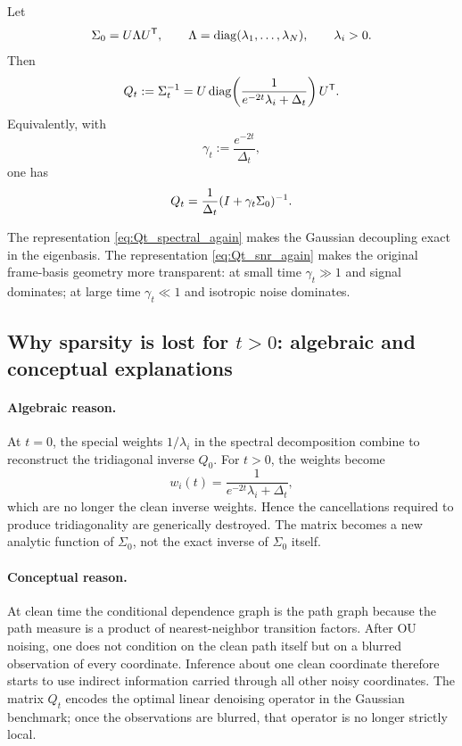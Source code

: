 \documentclass[11pt]{article}
\begin{document}
Let
\begin{equation}
 \Sigma_0=U\Lambda U^{\mathsf{T}},
 \qquad
 \Lambda=\operatorname{diag}(\lambda_1,\dots,\lambda_N),
 \qquad \lambda_i>0.
\end{equation}
Then
\begin{equation}\label{eq:Qt_spectral_again}
Q_t:=\Sigma_t^{-1}
=U\operatorname{diag}\!\left(\frac{1}{e^{-2t}\lambda_i+\Delta_t}\right)U^{\mathsf{T}}.
\end{equation}
Equivalently, with
\begin{equation}
 \gamma_t:=\frac{e^{-2t}}{\Delta_t},
\end{equation}
one has
\begin{equation}\label{eq:Qt_snr_again}
Q_t=\frac{1}{\Delta_t}(I+\gamma_t\Sigma_0)^{-1}.
\end{equation}

The representation \eqref{eq:Qt_spectral_again} makes the Gaussian decoupling exact in the eigenbasis. The representation \eqref{eq:Qt_snr_again} makes the original frame-basis geometry more transparent: at small time $\gamma_t\gg 1$ and signal dominates; at large time $\gamma_t\ll 1$ and isotropic noise dominates.

\subsection{Why sparsity is lost for $t>0$: algebraic and conceptual explanations}

\paragraph{Algebraic reason.}
At $t=0$, the special weights $1/\lambda_i$ in the spectral decomposition combine to reconstruct the tridiagonal inverse $Q_0$. For $t>0$, the weights become
\begin{equation}
 w_i(t)=\frac{1}{e^{-2t}\lambda_i+\Delta_t},
\end{equation}
which are no longer the clean inverse weights. Hence the cancellations required to produce tridiagonality are generically destroyed. The matrix becomes a new analytic function of $\Sigma_0$, not the exact inverse of $\Sigma_0$ itself.

\paragraph{Conceptual reason.}
At clean time the conditional dependence graph is the path graph because the path measure is a product of nearest-neighbor transition factors. After OU noising, one does not condition on the clean path itself but on a blurred observation of every coordinate. Inference about one clean coordinate therefore starts to use indirect information carried through all other noisy coordinates. The matrix $Q_t$ encodes the optimal linear denoising operator in the Gaussian benchmark; once the observations are blurred, that operator is no longer strictly local.
\end{document}
